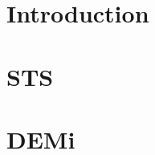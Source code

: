 

\begin{abstract}

\end{abstract}

\begin{frontmatter}

\tableofcontents



\end{frontmatter}

\chapter{Introduction}
\label{sec:intro}


\chapter{STS}
\label{sec:sts}


\chapter{DEMi}
\label{sec:demi}



%

%


\printbibliography


